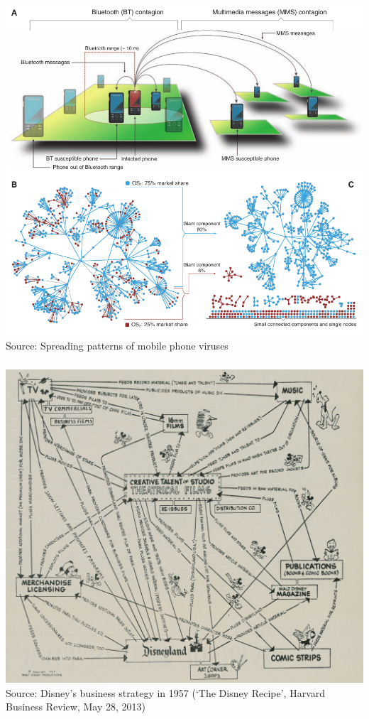 \documentclass[8pt]{beamer}
\begin{document}
\begin{frame} 
\frametitle{\insertsection}
\centering
\includegraphics[width=\linewidth,height=0.8\textheight,keepaspectratio]{mobile}\\
\tiny Source: Spreading patterns of mobile phone viruses \cite{Wang2009}
\end{frame}


\begin{frame}
\frametitle{\insertsection}
\centering
\includegraphics[width=\linewidth,height=0.8\textheight,keepaspectratio]{disney}\\
\tiny Source: Disney's business strategy in 1957 (`The Disney Recipe', Harvard Business Review, May 28, 2013)
\end{frame}
\end{document}
